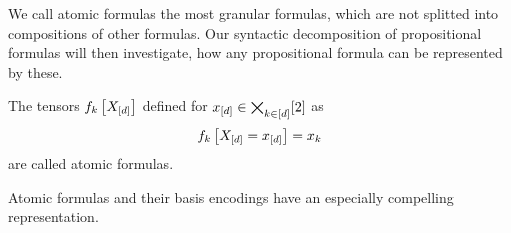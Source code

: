 
We call atomic formulas the most granular formulas, which are not splitted into compositions of other formulas.
Our syntactic decomposition of propositional formulas will then investigate, how any propositional formula can be represented by these.

\begin{definition}
	The tensors $f_{k}\left[X_{[d]}\right]$ defined for $x_{[d]}\in\bigtimes_{k\in[d]}[2]$ as
	\begin{align*}
		f_{k}\left[X_{[d]}=x_{[d]}\right]
		= x_{k}
	\end{align*}
	are called atomic formulas.
\end{definition}

Atomic formulas and their basis encodings have an especially compelling representation.

